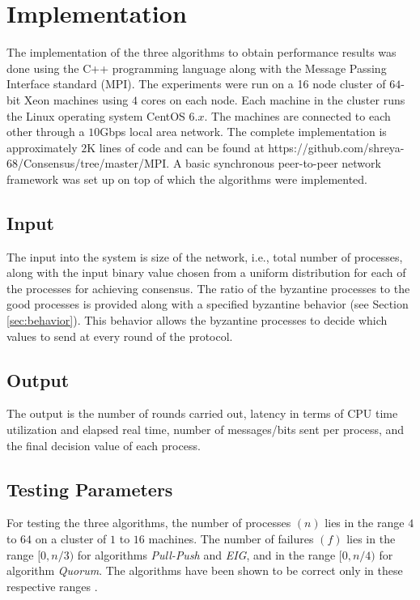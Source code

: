 ﻿\section{Implementation} \label{sec:eval} The implementation of the three
algorithms to obtain performance results was done using the C++ programming
language along with the Message Passing Interface standard (MPI).  The
experiments were run on a 16 node cluster of $64$-bit Xeon machines using $4$
cores on each node.  Each machine in the cluster runs the Linux operating
system CentOS $6.x$.  The machines are connected to each other through
a $10$Gbps local area network. The complete implementation is approximately
$2$K lines of code and can be found at
https://github.com/shreya-68/Consensus/tree/master/MPI. A basic synchronous
peer-to-peer network framework was set up on top of which the algorithms were
implemented.

\subsection{Input} The input into the system is size of the network, i.e.,
total number of processes, along with the input binary value chosen from a uniform distribution for each of the processes
for achieving consensus. The ratio of the byzantine processes to the good
processes is provided along with a specified byzantine behavior (see Section
\ref{sec:behavior}). This behavior allows the byzantine processes to decide
which values to send at every round of the protocol. 

\subsection{Output} The output is the number of rounds carried out, latency in
terms of CPU time utilization and elapsed real time, number of messages/bits
sent per process, and the final decision value of each process. 

\subsection{Testing Parameters} For testing the three algorithms, the number of
processes $(n)$ lies in the range $4$ to $64$ on a cluster of $1$ to $16$
machines. The number of failures $(f)$ lies in the range $[0, n/3)$ for
    algorithms \textit{Pull-Push} and \textit{EIG}, and in the range $[0, n/4)$
        for algorithm \textit{Quorum}. The algorithms have been shown to be
        correct only in these respective ranges \cite{BGH13,KM13,BPV06}. 

